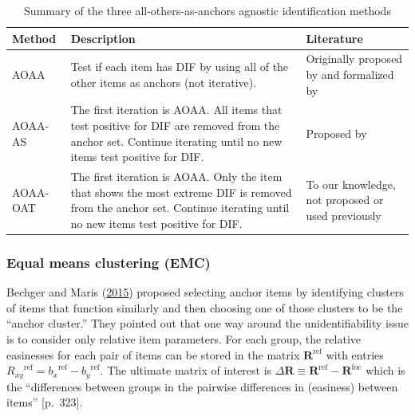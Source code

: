 \documentclass[
  11pt,
]{article}
\begin{document}
\begin{table}[H]
\caption{Summary of the three all-others-as-anchors agnostic identification methods}
\centering
\begin{tabular}{|p{2.5cm}|p{6cm}|p{4cm}|}
\toprule

Method & Description & Literature \\

\midrule

AOAA & Test if each item has DIF by using all of the other items as anchors (not iterative). & Originally proposed by \cite{lord1980} and formalized by \cite{thissen1993detection} \\\hline

AOAA-AS & The first iteration is AOAA. All items that test positive for DIF are removed from the anchor set. Continue iterating until no new items test positive for DIF. & Proposed by \cite{drasgow1987study} \\\hline

AOAA-OAT & The first iteration is AOAA. Only the item that shows the most extreme DIF is removed from the anchor set. Continue iterating until no new items test positive for DIF. & To our knowledge, not proposed or used previously \\

\bottomrule
\end{tabular}
\label{table:themethods}
\end{table}

\hypertarget{equal-means-clustering-emc}{%
\subsubsection{Equal means clustering (EMC)}\label{equal-means-clustering-emc}}

Bechger and Maris (\protect\hyperlink{ref-bechger2015statistical}{2015}) proposed selecting anchor items by identifying clusters of items that function similarly and then choosing one of those clusters to be the \enquote{anchor cluster.} They pointed out that one way around the unidentifiability issue is to consider only relative item parameters. For each group, the relative easinesses for each pair of items can be stored in the matrix \(\mathbf{R}^{\text{ref}}\) with entries \({R_{xy}}^{\text{ref}} = {b_x}^{\text{ref}} - {b_y}^{\text{ref}}\). The ultimate matrix of interest is \(\Delta \mathbf{R} \equiv \mathbf{R}^{\text{ref}}-\mathbf{R}^{\text{foc}}\) which is the \enquote{differences between groups in the pairwise differences in (easiness) between items} {[}p.~323{]}.
\end{document}
